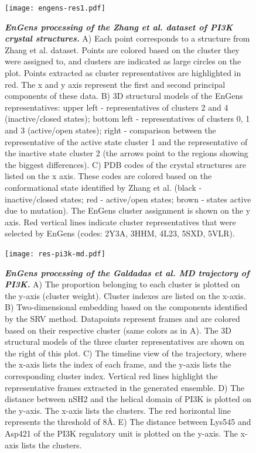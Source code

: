 \documentclass[numsec,webpdf,contemporary,large]{oup-authoring-template}
\theoremstyle{thmstyleone}%
\theoremstyle{thmstyletwo}%
\theoremstyle{thmstylethree}%
\begin{document}
\begin{figure}[!t]%
\centering
{\texttt{[image: engens-res1.pdf]}}
\caption{\textbf{\textit{EnGens processing of the  Zhang et al. dataset of PI3K crystal structures.}} A) Each point corresponds to a structure from Zhang et al. dataset. Points are colored based on the cluster they were assigned to, and clusters are indicated as large circles on the plot. Points extracted as cluster representatives are highlighted in red. The x and y axis represent the first and second principal components of these data. B) 3D structural models of the EnGens representatives:  upper left - representatives of clusters 2 and 4 (inactive/closed states); bottom left - representatives of clusters 0, 1 and 3  (active/open states); right - comparison between the representative of the active state cluster 1 and the representative of the inactive state cluster 2 (the arrows point to the regions showing the biggest differences). C) PDB codes of the crystal structures are listed on the x axis. These codes are colored based on the conformational state identified by Zhang et al. (black - inactive/closed states; red - active/open states; brown - states active due to mutation). The EnGens cluster assignment is shown on the y axis. Red vertical lines indicate cluster representatives that were selected by EnGens (codes: 2Y3A, 3HHM, 4L23, 5SXD, 5VLR).}\label{fig-res1a}
\end{figure}


\begin{figure}[!t]%
\centering
{\texttt{[image: res-pi3k-md.pdf]}}
\caption{\textbf{\textit{EnGens processing of the Galdadas et al. MD trajectory of PI3K.}} A) The proportion belonging to each cluster is plotted on the y-axis (cluster weight). Cluster indexes are listed on the x-axis. B) Two-dimensional embedding based on the components identified by the SRV method. Datapoints represent frames and are colored based on their respective cluster (same colors as in A). The 3D structural models of the three cluster representatives are shown on the right of this plot. C) The timeline view of the trajectory, where the x-axis lists  the index of each frame, and the y-axis lists the corresponding cluster index. Vertical red lines highlight the representative frames extracted in the generated ensemble. D) The distance between nSH2 and the helical domain of PI3K is plotted on the y-axis. The x-axis lists the clusters. The red horizontal line represents the threshold of 8Å.  E) The distance between Lys545 and Asp421 of the PI3K regulatory unit is plotted on the y-axis. The x-axis lists the clusters.}\label{fig-res1b}
\end{figure}
\end{document}
